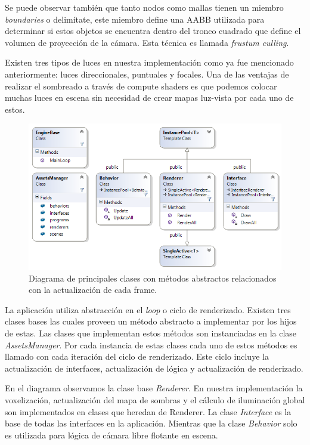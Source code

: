 Se puede observar también que tanto nodos como mallas tienen un miembro \emph{boundaries} o delimítate, este miembro define una \ac{AABB} utilizada para determinar si estos objetos se encuentra dentro del tronco cuadrado que define el volumen de proyección de la cámara. Esta técnica es llamada \emph{frustum culling}. 

Existen tres tipos de luces en nuestra implementación como ya fue mencionado anteriormente: luces direccionales, puntuales y focales. Una de las ventajas de realizar el sombreado a través de compute shaders es que podemos colocar muchas luces en escena sin necesidad de crear mapas luz-vista por cada uno de estos.

\begin{figure}[H]
	\centering
	\captionsetup{justification=centering}
	\includegraphics[width=\linewidth]{media/ClassDiagram.png}
	\caption{Diagrama de principales clases con métodos abstractos relacionados con la actualización de cada frame.}
\end{figure}

La aplicación utiliza abstracción en el \emph{loop} o ciclo de renderizado. Existen tres clases bases las cuales proveen un método abstracto a implementar por los hijos de estas. Las clases que implementan estos métodos son instanciadas en la clase \emph{AssetsManager}. Por cada instancia de estas clases cada uno de estos métodos es llamado con cada iteración del ciclo de renderizado. Este ciclo incluye la actualización de interfaces, actualización de lógica y actualización de renderizado.

En el diagrama observamos la clase base \emph{Renderer}. En nuestra implementación la voxelización, actualización del mapa de sombras y el cálculo de iluminación global son implementados en clases que heredan de Renderer. La clase \emph{Interface} es la base de todas las interfaces en la aplicación. Mientras que la clase \emph{Behavior} solo es utilizada para lógica de cámara libre flotante en escena.

